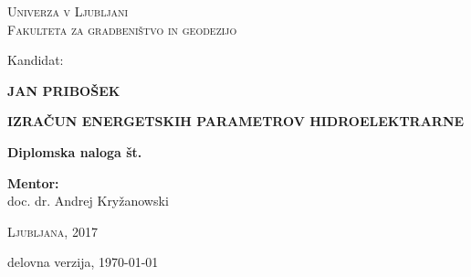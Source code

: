 \thispagestyle{empty}

\begin{minipage}{\textwidth}


\begin{center}
\vspace*{-1.5 cm}
\textsc{Univerza v Ljubljani}\\
\textsc{Fakulteta za gradbeništvo in geodezijo}

\vspace*{5cm}
Kandidat:\\
\vspace*{0.5cm}
\begin{large}
\textbf{JAN PRIBOŠEK}
\end{large}

\vspace*{1cm}

\begin{Large}
\textbf{IZRAČUN ENERGETSKIH PARAMETROV HIDROELEKTRARNE}
\end{Large}

\vspace*{1cm}

\begin{large}
\textbf{Diplomska naloga št.}
\end{large}

\end{center}
\vspace*{10cm}


\begin{large}
	\textbf{Mentor:}\\
	doc. dr. Andrej Kryžanowski \\
\end{large}

\begin{center}
\textsc{Ljubljana, 2017}

\vspace*{1cm}
delovna verzija, \today

\end{center}

\end{minipage}

\newpage
\thispagestyle{empty}
\cleardoublepage